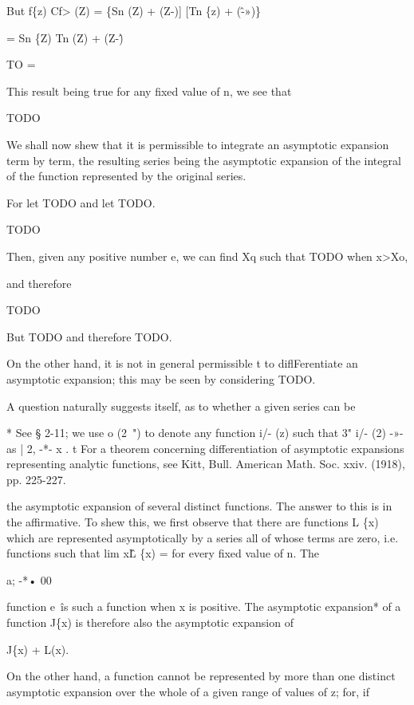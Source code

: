 But f\{z) Cf> (Z) = \{Sn (Z) + (Z-)] [Tn \{z) + (\^-»)\}

= Sn \{Z) Tn (Z) + (Z-\^)

TO =

This result being true for any fixed value of n, we see that

TODO


We shall now shew that it is permissible to integrate an asymptotic
expansion term by term, the resulting series being the asymptotic
expansion of the integral of the function represented by the original
series.

For let TODO and let TODO.

TODO

Then, given any positive number e, we can find Xq such that TODO when
x>Xo,

and therefore

TODO

But TODO and therefore TODO.

On the other hand, it is not in general permissible t to
diflFerentiate an asymptotic expansion; this may be seen by
considering TODO.


A question naturally suggests itself, as to whether a given series can
be

* See § 2-11; we use o (2~") to denote any function i/- (z) such that
3" i/- (2) -»- as | 2, -*- x . t For a theorem concerning
differentiation of asymptotic expansions representing analytic
functions, see Kitt, Bull. American Math. Soc. xxiv. (1918), pp.
225-227.

%
%

the asymptotic expansion of several distinct functions. The answer to
this is in the affirmative. To shew this, we first observe that there
are functions L \{x) which are represented asymptotically by a series
all of whose terms are zero, i.e. functions such that lim x\^L \{x) =
for every fixed value of n. The

a; -*• 00

function e~\^ is such a function when x is positive. The asymptotic
expansion* of a function J\{x) is therefore also the asymptotic
expansion of

J\{x) + L(x).

On the other hand, a function cannot be represented by more than one
distinct asymptotic expansion over the whole of a given range of
values of z; for, if

